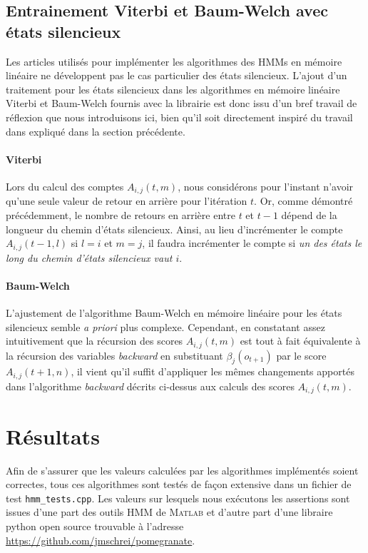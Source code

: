 \documentclass[letterpaper]{article}
\begin{document}
\subsection{Entrainement Viterbi et Baum-Welch avec états silencieux}
Les articles utilisés pour implémenter les algorithmes des HMMs en mémoire linéaire ne développent pas le cas particulier des états silencieux. L'ajout d'un traitement pour les états silencieux dans les algorithmes en mémoire linéaire Viterbi et Baum-Welch fournis avec la librairie est donc issu d'un bref travail de réflexion que nous introduisons ici, bien qu'il soit directement inspiré du travail dans \cite{Durbin} expliqué dans la section précédente.

\paragraph{Viterbi}
Lors du calcul des comptes $A_{i,j}(t, m)$, nous considérons pour l'instant n'avoir qu'une seule valeur de retour en arrière pour l'itération $t$. Or, comme démontré précédemment, le nombre de retours en arrière entre $t$ et $t-1$ dépend de la longueur du chemin d'états silencieux. Ainsi, au lieu d'incrémenter le compte $A_{i,j}(t-1, l)$ si $l=i$ et $m=j$, il faudra incrémenter le compte si \textit{un des états le long du chemin d'états silencieux vaut $i$}. 

\paragraph{Baum-Welch}
L'ajustement de l'algorithme Baum-Welch en mémoire linéaire pour les états silencieux semble \textit{a priori} plus complexe. Cependant, en constatant assez intuitivement que la récursion des scores $A_{i,j}(t, m)$ est tout à fait équivalente à la récursion des variables \textit{backward} en substituant $\beta_j(o_{t+1})$ par le score $A_{i,j}(t+1, n)$, il vient qu'il suffit d'appliquer les mêmes changements apportés dans l'algorithme \textit{backward} décrits ci-dessus aux calculs des scores $A_{i,j}(t, m)$.

\section{Résultats}
Afin de s'assurer que les valeurs calculées par les algorithmes implémentés soient correctes,  tous ces algorithmes sont testés de façon extensive dans un fichier de test \texttt{hmm\_tests.cpp}. Les valeurs sur lesquels nous exécutons les assertions sont issues d'une part des outils HMM de \textsc{Matlab} et d'autre part d'une libraire python open source trouvable à l'adresse \url{https://github.com/jmschrei/pomegranate}. \\
\end{document}
